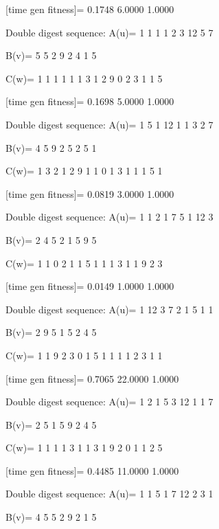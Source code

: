 [time gen fitness]=
    0.1748    6.0000    1.0000

Double digest sequence:
A(u)=
     1     1     1     1     2     3    12     5     7

B(v)=
     5     5     2     9     2     4     1     5

C(w)=
     1     1     1     1     1     1     3     1     2     9     0     2     3     1     1     5

[time gen fitness]=
    0.1698    5.0000    1.0000

Double digest sequence:
A(u)=
     1     5     1    12     1     1     3     2     7

B(v)=
     4     5     9     2     5     2     5     1

C(w)=
     1     3     2     1     2     9     1     1     0     1     3     1     1     1     5     1

[time gen fitness]=
    0.0819    3.0000    1.0000

Double digest sequence:
A(u)=
     1     1     2     1     7     5     1    12     3

B(v)=
     2     4     5     2     1     5     9     5

C(w)=
     1     1     0     2     1     1     5     1     1     1     3     1     1     9     2     3

[time gen fitness]=
    0.0149    1.0000    1.0000

Double digest sequence:
A(u)=
     1    12     3     7     2     1     5     1     1

B(v)=
     2     9     5     1     5     2     4     5

C(w)=
     1     1     9     2     3     0     1     5     1     1     1     1     2     3     1     1

[time gen fitness]=
    0.7065   22.0000    1.0000

Double digest sequence:
A(u)=
     1     2     1     5     3    12     1     1     7

B(v)=
     2     5     1     5     9     2     4     5

C(w)=
     1     1     1     1     3     1     1     3     1     9     2     0     1     1     2     5

[time gen fitness]=
    0.4485   11.0000    1.0000

Double digest sequence:
A(u)=
     1     1     5     1     7    12     2     3     1

B(v)=
     4     5     5     2     9     2     1     5

